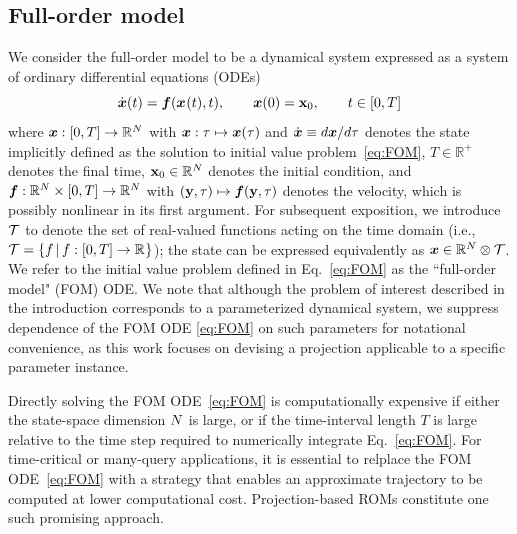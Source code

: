 \documentclass[3p,computermodern,10pt]{elsarticle}
\begin{document}
	\subsection{Full-order model}\label{sec;FOM}
We consider the full-order model to be a dynamical system expressed as a
	system of ordinary differential equations (ODEs)
\begin{equation}\label{eq:FOM}
 \dot{{\boldsymbol x}}(t)  = \boldsymbol f({\boldsymbol x}^{}(t),t), \qquad {\boldsymbol x}(0) =
	{{\mathbf{x}}_0},\qquad t \in [0,T]
\end{equation}
where  ${\boldsymbol x}: [0,T]
	\rightarrow  \mathbb{R}^{N}$ with ${\boldsymbol x}: \tau \mapsto
	{\boldsymbol x}(\tau) $ and $\dot{{\boldsymbol x}} \equiv {d {\boldsymbol x}}/{d\tau}$
	denotes the state implicitly defined as the solution to initial value
	problem~\eqref{eq:FOM}, 
$T \in \mathbb{R}^+$ denotes the final time, 
 ${{\mathbf{x}}_0} \in \mathbb{R}^{N}$ denotes the initial condition,
	and $\boldsymbol f: \mathbb{R}^{N} \times [0,T] \rightarrow
	\mathbb{R}^{N}$ with $(\mathbf{y},\tau) \mapsto
	\boldsymbol f(\mathbf{y},\tau)$ denotes the velocity, which is possibly
	nonlinear in its first argument. For subsequent exposition, we introduce
	$\mathcal{T}$ to denote the set of real-valued functions acting on the time
	domain (i.e., $\mathcal{T} = \{f\,|\,f:[0,T]\rightarrow\mathbb{R}^{}\}$); the
	state can be expressed equivalently as ${\boldsymbol x} \in \mathbb{R}^{N} \otimes
	\mathcal{T} $.  We refer to the initial value problem defined in
	Eq.~\eqref{eq:FOM} as the ``full-order model" (FOM) ODE. We note that
	although the problem of interest described in the introduction corresponds
	to a parameterized dynamical system, we suppress dependence of the FOM ODE
	\eqref{eq:FOM} on such parameters for notational convenience, as this work
	focuses on devising a projection applicable to a specific parameter instance.

Directly solving the FOM ODE~\eqref{eq:FOM} is computationally expensive if
	either the state-space dimension $N$ is large, or if the time-interval
	length $T$ is large relative to the time step required to numerically
	integrate Eq.~\eqref{eq:FOM}. For time-critical or many-query applications,
	it is essential to relplace the FOM ODE~\eqref{eq:FOM} with a strategy that
	enables an approximate trajectory to be computed at lower computational
	cost. Projection-based ROMs constitute one such promising approach. 
\end{document}
